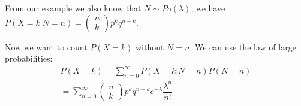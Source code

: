 \par\bigskip
\noindent From our example we also know that $N\sim Po(\lambda)$, we have $P(X=k|N=n) = \begin{pmatrix}n\\k\end{pmatrix}p^kq^{n-k}$.\par
\noindent Now we want to count $P(X=k)$ without $N=n$. We can use the law of large probabilities:
\begin{equation*}
  \begin{gathered}
    P(X=k) =\sum_{n=0}^{\infty}P(X=k|N=n)P(N=n)\\
    = \sum_{n=0}^{\infty}\begin{pmatrix}n\\k\end{pmatrix}p^kq^{n-k}e^{-\lambda}\dfrac{\lambda^n}{n!}
  \end{gathered}
\end{equation*}
